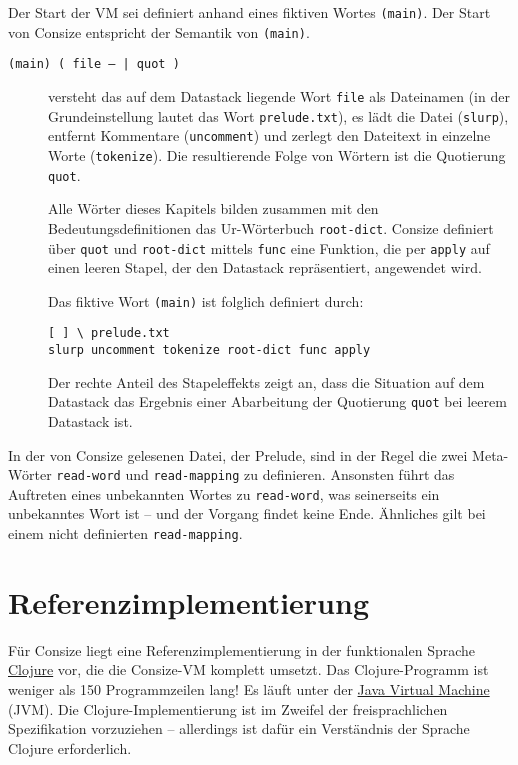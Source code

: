 Der Start der VM sei definiert anhand eines fiktiven Wortes \verb|(main)|. Der Start von Consize entspricht der Semantik von \verb|(main)|.

\begin{description}
\item[\texttt{(main) ( file -- | quot )}] versteht das auf dem Datastack liegende Wort \verb|file| als Dateinamen (in der Grundeinstellung lautet das Wort \verb|prelude.txt|), es lädt die Datei (\verb|slurp|), entfernt Kommentare (\verb|uncomment|) und zerlegt den Dateitext in einzelne Worte (\verb|tokenize|). Die resultierende Folge von Wörtern ist die Quotierung \verb|quot|. 

Alle Wörter dieses Kapitels bilden zusammen mit den Bedeutungsdefinitionen das Ur-Wörterbuch \verb|root-dict|. Consize definiert über \verb|quot| und \verb|root-dict| mittels \verb|func| eine Funktion, die per \verb|apply| auf einen leeren Stapel, der den Datastack repräsentiert, angewendet wird.

Das fiktive Wort \verb|(main)| ist folglich definiert durch:
\begin{verbatim}
[ ] \ prelude.txt
slurp uncomment tokenize root-dict func apply
\end{verbatim}
Der rechte Anteil des Stapeleffekts zeigt an, dass die Situation auf dem Datastack das Ergebnis einer Abarbeitung der Quotierung \verb|quot| bei leerem Datastack ist.
\end{description}

\attention In der von Consize gelesenen Datei, der Prelude, sind in der Regel die zwei Meta-Wörter \verb|read-word| und \verb|read-mapping| zu definieren. Ansonsten führt das Auftreten eines unbekannten Wortes zu \verb|read-word|, was seinerseits ein unbekanntes Wort ist -- und der Vorgang findet keine Ende. Ähnliches gilt bei einem nicht definierten \verb|read-mapping|.

\section{Referenzimplementierung}
\label{Sec:Referenzimplementierung}

Für Consize liegt eine Referenzimplementierung in der funktionalen Sprache \href{http://clojure.org/}{Clojure} vor, die die Consize-VM komplett umsetzt. Das Clojure-Programm ist weniger als 150 Programmzeilen lang! Es läuft unter der \href{http://de.wikipedia.org/wiki/Java\_Virtual\_Machine}{Java Virtual Machine} (JVM). Die Clojure-Implementierung ist im Zweifel der freisprachlichen Spezifikation vorzuziehen -- allerdings ist dafür ein Verständnis der Sprache Clojure erforderlich.

